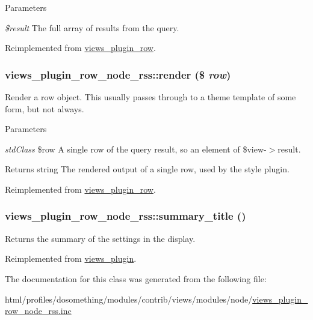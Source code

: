 \begin{DoxyParams}{Parameters}
\item[{\em \$result}]The full array of results from the query. \end{DoxyParams}


Reimplemented from \hyperlink{classviews__plugin__row_ae49a23f750874e4b3d294aa3a20ecd64}{views\_\-plugin\_\-row}.\hypertarget{classviews__plugin__row__node__rss_a94b9baa2d0a6e196f3da863cf1784343}{
\subsubsection[{render}]{\setlength{\rightskip}{0pt plus 5cm}views\_\-plugin\_\-row\_\-node\_\-rss::render (\$ {\em row})}}
\label{classviews__plugin__row__node__rss_a94b9baa2d0a6e196f3da863cf1784343}
Render a row object. This usually passes through to a theme template of some form, but not always.


\begin{DoxyParams}{Parameters}
\item[{\em stdClass}]\$row A single row of the query result, so an element of \$view-\/$>$result.\end{DoxyParams}
\begin{DoxyReturn}{Returns}
string The rendered output of a single row, used by the style plugin. 
\end{DoxyReturn}


Reimplemented from \hyperlink{classviews__plugin__row_a8243842e087dd28664b32cef0309f2a6}{views\_\-plugin\_\-row}.\hypertarget{classviews__plugin__row__node__rss_a02990378bdbc80b7b20ec6d520ca34e9}{
\subsubsection[{summary\_\-title}]{\setlength{\rightskip}{0pt plus 5cm}views\_\-plugin\_\-row\_\-node\_\-rss::summary\_\-title ()}}
\label{classviews__plugin__row__node__rss_a02990378bdbc80b7b20ec6d520ca34e9}
Returns the summary of the settings in the display. 

Reimplemented from \hyperlink{classviews__plugin_a9a4aaece48a7cf465dd95d59a3bc5ea1}{views\_\-plugin}.

The documentation for this class was generated from the following file:\begin{DoxyCompactItemize}
\item 
html/profiles/dosomething/modules/contrib/views/modules/node/\hyperlink{views__plugin__row__node__rss_8inc}{views\_\-plugin\_\-row\_\-node\_\-rss.inc}\end{DoxyCompactItemize}
